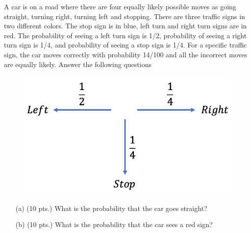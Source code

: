 \documentclass[a4paper, 11pt]{report}
\begin{document}
{A car is on a road where there are four equally likely possible moves as going straight, turning right, turning left and stopping. There are three traffic signs in two different colors. The stop sign is in blue, left turn and right turn signs are in red. The probability of seeing a left turn sign is 1/2, probability of seeing a right turn sign is 1/4, and probability of seeing a stop sign is 1/4. For a specific traffic sign, the car moves correctly with probability 14/100 and all the incorrect moves are equally likely. Answer the following questions
\begin{figure}[h]
\includegraphics[scale=.57]{4.png}
\centering
\end{figure}
\begin{enumerate}
\item[(a)] (10 pts.) What is the probability that the car goes straight?
{}
\item[(b)] (10 pts.) What is the probability that the car sees a red sign?
{\color{blue}{\begin{align*}

\end{align*}}}
\end{enumerate}}
\end{document}

